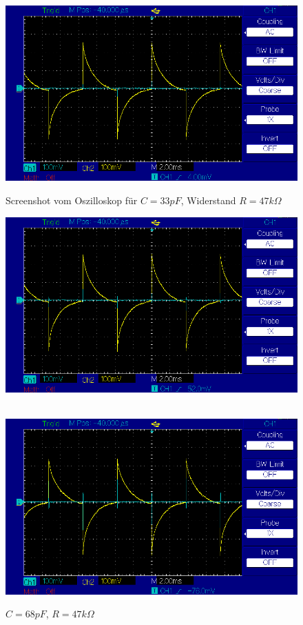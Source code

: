 \documentclass{article}
\begin{document}
\begin{figure}[!h]
        \centering
        \includegraphics[width=\linewidth]{figures/results/resistor_47_Ohm/c33pF.png}
        \caption{Screenshot vom Oszilloskop für $C = 33pF$, Widerstand $R = 47k\Omega$}
        \label{img:c33e0_r47}
    \endminipage\hfill
        \centering
        \includegraphics[width=\linewidth]{figures/results/resistor_47_Ohm/c68pF.png}
        \caption{$C = 68 pF$, $R = 47 k\Omega$}
        \label{img:c68e0_r47}
    \endminipage\hfill \\
        \centering
        \includegraphics[width=\linewidth]{figures/results/resistor_47_Ohm/c330pF.png}

\end{figure}
\end{document}
